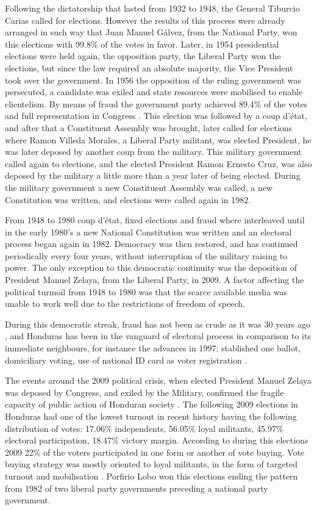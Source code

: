 \documentclass[letterpaper,10pt]{article}
\begin{document}
Following the dictatorship that lasted from 1932 to 1948, the General Tiburcio Carias called for elections. However the results of this process were already arranged in such way that Juan Manuel Gálvez, from the National Party, won this elections with 99.8\% of the votes in favor. Later, in 1954 presidential elections were held again, the opposition party, the Liberal Party won the elections, but since the law required an absolute majority, the Vice President took over the government. In 1956 the opposition of the ruling government was persecuted, a candidate was exiled and state resources were mobilised to enable clientelism. By means of fraud the government party achieved 89.4\% of the votes and full representation in Congress \citep{romero2014}. This election was followed by a coup d'\'{e}tat, and after that a Constituent Assembly was brought, later called for elections where Ramon Villeda Morales, a Liberal Party militant, was elected President, he was later deposed by another coup from the military. This military government called again to elections, and the elected President Ramon Ernesto Cruz, was also deposed by the military a little more than a year later of being elected. During the military government a new Constituent Assembly was called, a new Constitution was written, and elections were called again in 1982.

From 1948 to 1980 coup d'\'{e}tat, fixed elections and fraud where interleaved until in the early 1980's a new National Constitution was written and an electoral process began again in 1982. Democracy was then restored, and has continued periodically every four years, without interruption of the military raising to power. The only exception to this democratic continuity was the deposition of President Manuel Zelaya, from the Liberal Party, in 2009. A factor affecting the political turmoil from 1948 to 1980 was that the scarce available media was unable to work well due to the restrictions of freedom of speech. 

During this democratic streak, fraud has not been as crude as it was 30 years ago \citep{romero2014}, and Honduras has been in the vanguard of electoral process in comparison to its immediate neighbours, for instance the advances in 1997: stablished one ballot, domiciliary voting, use of national ID card as voter registration \citep{romero2014}.

The events around the 2009 political crisis, when elected President Manuel Zelaya was deposed by Congress, and exiled by the Military, confirmed the fragile capacity of public action of Honduran society \citep{romero2014}. The following 2009 elections in Honduras had one of the lowest turnout in recent history having the following distribution of votes: 17.06\% independents, 56.05\% loyal militants, 45.97\% electoral participation, 18.47\% victory margin. According to \cite{gonza2014} during this elections 2009 22\% of the voters participated in one form or another of vote buying. Vote buying strategy was mostly oriented to loyal militants, in the form of targeted turnout and mobilisation \citep{gonza2014}. Porfirio Lobo won this elections ending the pattern from 1982 of two liberal party governments preceding a national party government.
\end{document}
